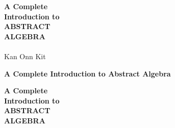 {\begin{titlepage}
        \vspace*{\fill}
        \vspace{0.7cm}  %

        \begin{center}
            \color{white}

            {\fontsize{16pt}{0pt}\selectfont \textbf{A Complete}\\\textbf{Introduction to}}\\

            \vspace{0.3cm}
            {\fontsize{40pt}{0pt}\selectfont \textbf{ABSTRACT}}\\
            \vspace{0.15cm}
            {\fontsize{40pt}{0pt}\selectfont \textbf{ALGEBRA}}\\

            \vspace{0.4cm}
            {\fontsize{12pt}{0pt}\selectfont \editiontext}\\

            \vspace{0.9cm}
            {\fontsize{18pt}{0pt}\selectfont Kan Onn Kit}\\
            \vspace{0.25cm}
        \end{center}
        \vspace*{\fill}
    \end{titlepage}
}{
    \thispagestyle{empty}
    \null\vspace{4cm}
    \begin{raggedleft}
        {\fontsize{24pt}{0pt}\selectfont \textbf{A Complete Introduction to Abstract Algebra}}\\
    \end{raggedleft}

    \begin{titlepage}
        \null\vspace{4cm}
        \begin{raggedleft}
            {\fontsize{20pt}{0pt}\selectfont \textbf{A Complete}\\\textbf{Introduction to}}\\

            \vspace{0.4cm}
            {\fontsize{48pt}{0pt}\selectfont \textbf{ABSTRACT}}\\
            \vspace{0.15cm}
            {\fontsize{48pt}{0pt}\selectfont \textbf{ALGEBRA}}\\


\end{raggedleft}
\end{titlepage}}

